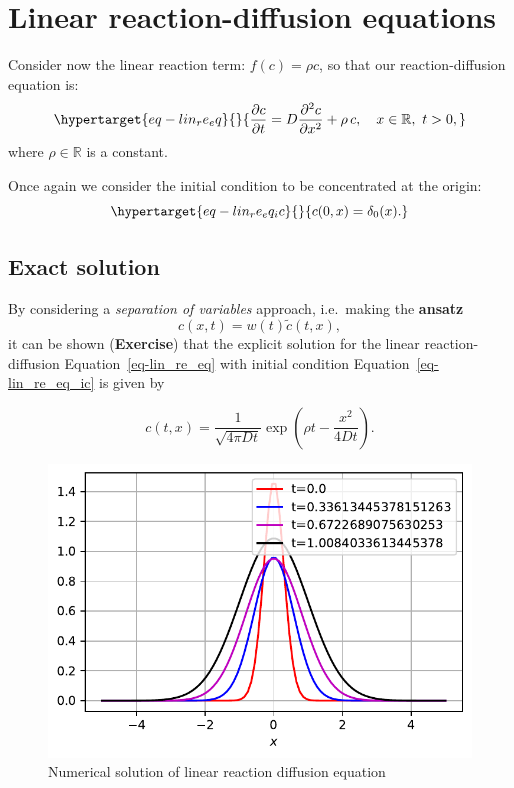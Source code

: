 \documentclass[
  letterpaper,
  DIV=11,
  numbers=noendperiod]{scrreprt}
\theoremstyle{definition}
\theoremstyle{plain}
\theoremstyle{plain}
\theoremstyle{remark}
\begin{document}
\hypertarget{linear-reaction-diffusion-equations-1}{%
\section{Linear reaction-diffusion
equations}\label{linear-reaction-diffusion-equations-1}}

Consider now the linear reaction term: \(f(c) = \rho c\), so that our
reaction-diffusion equation is:
\begin{equation}\protect\hypertarget{eq-lin_re_eq}{}{
\frac{\partial c}{\partial t} = D \frac{\partial^2 c}{\partial x^2}   + \rho \, c, \quad x\in \mathbb R, \, \, t >0, 
}\label{eq-lin_re_eq}\end{equation} where \(\rho \in \mathbb R\) is a
constant.

Once again we consider the initial condition to be concentrated at the
origin: \begin{equation}\protect\hypertarget{eq-lin_re_eq_ic}{}{
c(0,x) = \delta_0(x).
}\label{eq-lin_re_eq_ic}\end{equation}

\hypertarget{exact-solution}{%
\subsection{Exact solution}\label{exact-solution}}

By considering a \emph{separation of variables} approach, i.e.~making
the \textbf{ansatz} \[
c(x,t) = w(t) \tilde c(t,x),
\] it can be shown (\textbf{Exercise}) that the explicit solution for
the linear reaction-diffusion Equation~\ref{eq-lin_re_eq} with initial
condition Equation~\ref{eq-lin_re_eq_ic} is given by

\[
c(t,x) = \frac1{\sqrt{4 \pi D t}} \exp \left(\rho t - \frac{x^2}{ 4Dt} \right).
\]

\begin{figure}

{\centering \includegraphics{linearreactiondiffusion_files/figure-pdf/fig-diffusionlinearsource-output-1.pdf}

}

\caption{\label{fig-diffusionlinearsource}Numerical solution of linear
reaction diffusion equation}

\end{figure}
\end{document}
